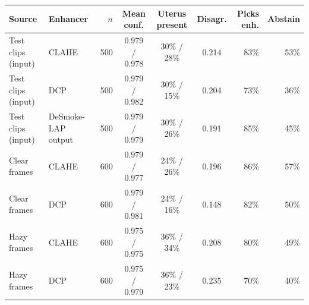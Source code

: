\documentclass{midl}
\begin{document}
\begin{table}[htbp]
{\tiny\begin{tabular}{llrcccrr}\toprule Source & Enhancer & $n$ & Mean conf. & Uterus present & Disagr. & Picks enh. & Abstain\\\midrule
Test clips (input) & CLAHE & 500 & 0.979 / 0.978 & 30\% / 28\% & 0.214 & 83\% & 53\% \\
Test clips (input) & DCP & 500 & 0.979 / 0.982 & 30\% / 15\% & 0.204 & 73\% & 36\% \\
Test clips (input) & DeSmoke-LAP output & 500 & 0.979 / 0.979 & 30\% / 26\% & 0.191 & 85\% & 45\% \\
Clear frames & CLAHE & 600 & 0.979 / 0.977 & 24\% / 26\% & 0.196 & 86\% & 57\% \\
Clear frames & DCP & 600 & 0.979 / 0.981 & 24\% / 16\% & 0.148 & 82\% & 50\% \\
Hazy frames & CLAHE & 600 & 0.975 / 0.975 & 36\% / 34\% & 0.208 & 80\% & 49\% \\
Hazy frames & DCP & 600 & 0.975 / 0.979 & 36\% / 23\% & 0.235 & 70\% & 40\% \\
\bottomrule\end{tabular}}
\end{table}
\end{document}
